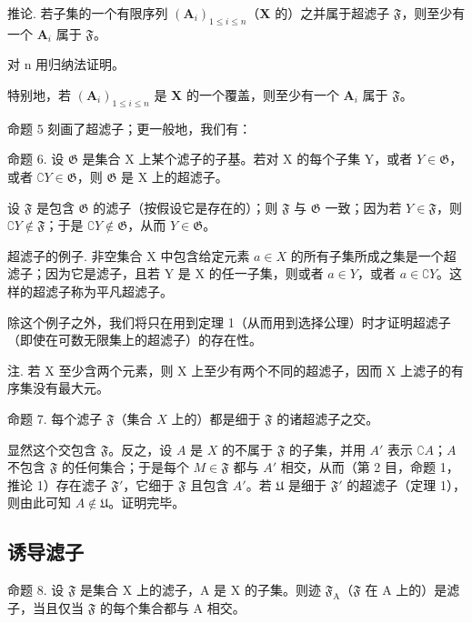 推论. 若子集的一个有限序列 \((\mathbf{A}_i)_{1 \leqslant i \leqslant n}\)（\(\mathbf{X}\) 的）之并属于超滤子 \(\mathfrak{F}\)，则至少有一个 \(\mathbf{A}_i\) 属于 \(\mathfrak{F}\)。

对 n 用归纳法证明。

特别地，若 \((\mathbf{A}_i)_{1\leqslant i\leqslant n}\) 是 \(\mathbf{X}\) 的一个覆盖，则至少有一个 \(\mathbf{A}_i\) 属于 \(\mathfrak{F}\)。

命题 5 刻画了超滤子；更一般地，我们有：

命题 6. 设 \(\mathfrak{G}\) 是集合 X 上某个滤子的子基。若对 X 的每个子集 Y，或者 \(Y \in \mathfrak{G}\)，或者 \(\complement Y \in \mathfrak{G}\)，则 \(\mathfrak{G}\) 是 X 上的超滤子。

设 \(\mathfrak{F}\) 是包含 \(\mathfrak{G}\) 的滤子（按假设它是存在的）；则 \(\mathfrak{F}\) 与 \(\mathfrak{G}\) 一致；因为若 \(Y \in \mathfrak{F}\)，则 \(\complement Y \notin \mathfrak{F}\)；于是 \(\complement Y \notin \mathfrak{G}\)，从而 \(Y \in \mathfrak{G}\)。

超滤子的例子. 非空集合 X 中包含给定元素 \(a \in X\) 的所有子集所成之集是一个超滤子；因为它是滤子，且若 Y 是 X 的任一子集，则或者 \(a \in Y\)，或者 \(a \in \complement Y\)。这样的超滤子称为平凡超滤子。

除这个例子之外，我们将只在用到定理 1（从而用到选择公理）时才证明超滤子（即使在可数无限集上的超滤子）的存在性。

注. 若 X 至少含两个元素，则 X 上至少有两个不同的超滤子，因而 X 上滤子的有序集没有最大元。

命题 7. 每个滤子 \(\mathfrak{F}\)（集合 \(X\) 上的）都是细于 \(\mathfrak{F}\) 的诸超滤子之交。

显然这个交包含 \(\mathfrak{F}\)。反之，设 \(A\) 是 \(X\) 的不属于 \(\mathfrak{F}\) 的子集，并用 \(A'\) 表示 \(\complement A\)；\(A\) 不包含 \(\mathfrak{F}\) 的任何集合；于是每个 \(M \in \mathfrak{F}\) 都与 \(A'\) 相交，从而（第 2 目，命题 1，推论 1）存在滤子 \(\mathfrak{F}'\)，它细于 \(\mathfrak{F}\) 且包含 \(A'\)。若 \(\mathfrak{U}\) 是细于 \(\mathfrak{F}'\) 的超滤子（定理 1），则由此可知 \(A \notin \mathfrak{U}\)。证明完毕。

\subsection{诱导滤子}

命题 8. 设 \(\mathfrak{F}\) 是集合 X 上的滤子，A 是 X 的子集。则迹 \(\mathfrak{F}_{\mathrm{A}}\)（\(\mathfrak{F}\) 在 A 上的）是滤子，当且仅当 \(\mathfrak{F}\) 的每个集合都与 A 相交。

